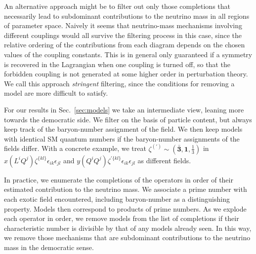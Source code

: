 An alternative approach might be to filter out only those completions that
necessarily lead to subdominant contributions to the neutrino mass in all
regions of parameter space. Naively it seems that neutrino-mass mechanisms
involving different couplings would all survive the filtering process in this
case, since the relative ordering of the contributions from each diagram depends
on the chosen values of the coupling constants. This is in general only
guaranteed if a symmetry is recovered in the Lagrangian when one coupling is
turned off, so that the forbidden coupling is not generated at some higher order
in perturbation theory. We call this approach \textit{stringent} filtering,
since the conditions for removing a model are more difficult to satisfy.

For our results in Sec.~\ref{sec:models} we take an intermediate view, leaning
more towards the democratic side. We filter on the basis of particle content,
but always keep track of the baryon-number assignment of the field. We then keep
models with identical SM quantum numbers if the baryon-number assignments of the
fields differ. With a concrete example, we treat
$\zeta^{(\prime)} \sim (\bar{\mathbf{3}}, \mathbf{1}, \tfrac{1}{3})$ in
$x (L^{i} Q^{j}) \zeta^{\{kl\}} \epsilon_{ik} \epsilon_{jl}$ and
$y (Q^{i} Q^{j}) \zeta^{\prime \{kl\}} \epsilon_{ik} \epsilon_{jl}$ as different
fields.

In practice, we enumerate the completions of the operators in order of their
estimated contribution to the neutrino mass. We associate a prime number with
each exotic field encountered, including baryon-number as a distinguishing
property. Models then correspond to products of prime numbers. As we explode
each operator in order, we remove models from the list of completions if their
characteristic number is divisible by that of any models already seen. In this
way, we remove those mechanisms that are subdominant contributions to the
neutrino mass in the democratic sense.

